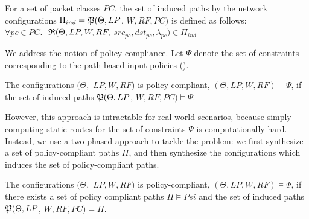 \begin{definition}
For a set of packet classes $PC$, the set of induced
paths by the network configurations $\Pi_{ind} = \mathfrak{P}(\Theta, LP$, 
$W, RF, PC)$ is defined as follows: \\
$\forall pc \in PC.$
$~\mathfrak{R}(\Theta, LP, W, RF,$ $src_{pc}, dst_{pc}, \lambda_{pc}) \in \Pi_{ind} $
\end{definition}

\noindent We address the notion of policy-compliance. Let 
$\Psi$ denote the set of constraints corresponding to the 
path-based input policies (). 
\begin{definition}
	The configurations $(\Theta,$ $LP, W, RF)$ is policy-compliant,
	$(\Theta, LP, W, RF) \models \Psi$, if the set of
	induced paths $\mathfrak{P}(\Theta, LP$, $W, RF, PC) \models \Psi$.
\end{definition}

However, this approach is intractable for real-world scenarios,
because simply computing static routes for the set of constraints 
$\Psi$ is computationally hard. Instead, we use a two-phased approach
to tackle the problem: we first synthesize a set of policy-compliant
paths $\Pi$, and then synthesize the configurations which induces
the set of policy-compliant paths. 
\begin{definition}
	The configurations $(\Theta,$ $LP, W, RF)$ is policy-compliant,
	$(\Theta, LP, W, RF) \models \Psi$, if there exists a set of
	policy compliant paths $\Pi \models Psi$ and the set of
	induced paths $\mathfrak{P}(\Theta, LP$, $W, RF, PC) = \Pi$.
\end{definition}


